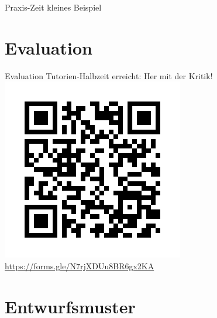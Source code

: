 \documentclass[18pt]{beamer}
\begin{document}
\begin{frame}{Praxis-Zeit}
	\huge \centering kleines Beispiel
\end{frame}

\section{Evaluation}
	\begin{frame}{Evaluation}
	\centering Tutorien-Halbzeit erreicht: Her mit der Kritik!
	\centering \includegraphics[scale=0.6]{pics/tut3/frame.png}
	\url{https://forms.gle/N7rjXDUu8BR6gx2KA}
\end{frame}

\section{Entwurfsmuster}
\end{document}
